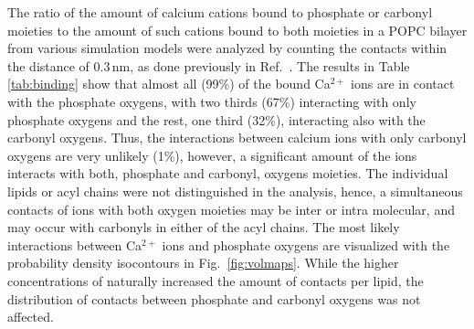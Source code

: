 \documentclass[aip,jcp,twocolumn]{revtex4}
\begin{document}
The ratio of the amount of calcium cations 
bound to phosphate or carbonyl moieties 
to the amount of such cations bound to both moieties in a POPC bilayer 
from various simulation models
were analyzed by counting the contacts within the distance of $0.3 \, \mathrm{nm}$, 
as done previously in Ref.~. 
%
%
%
The results in Table \ref{tab:binding} show that almost all (99\%) of the 
bound Ca$^{2+}$ ions are in contact with the phosphate oxygens,
with two thirds (67\%) interacting with only phosphate oxygens
and the rest, one third (32\%), interacting also with the carbonyl oxygens. 
Thus, the interactions between
calcium ions with only carbonyl oxygens are very unlikely (1\%), however, a significant
amount of the ions interacts with both, phosphate and carbonyl, oxygens moieties.
The individual lipids or acyl chains were not distinguished in the analysis,
hence, a simultaneous contacts of ions with both oxygen moieties may be inter or intra molecular,
and may occur with carbonyls in either of the acyl chains.
The most likely interactions between Ca$^{2+}$ ions and phosphate oxygens are visualized with
the probability density isocontours in Fig.~\ref{fig:volmaps}.
While the higher concentrations of  naturally increased the amount of contacts per lipid,
the distribution of contacts between phosphate and carbonyl oxygens was not affected.
\end{document}
